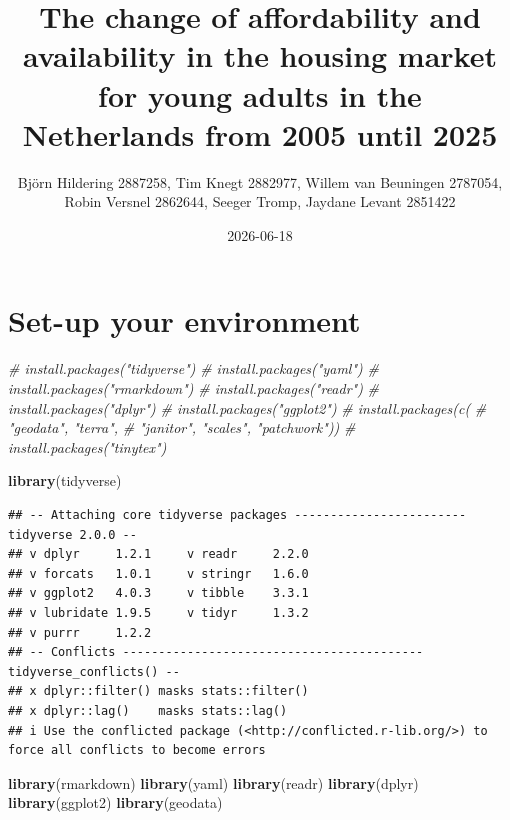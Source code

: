 \documentclass[
]{article}
\title{The change of affordability and availability in the housing
market for young adults in the Netherlands from 2005 until 2025}
\author{Björn Hildering 2887258, Tim Knegt 2882977, Willem van Beuningen
2787054, Robin Versnel 2862644, Seeger Tromp, Jaydane Levant 2851422}
\date{2026-06-18}
\newenvironment{Shaded}{\begin{snugshade}}{\end{snugshade}}
\newcommand{\CommentTok}[1]{\textcolor[rgb]{0.56,0.35,0.01}{\textit{#1}}}
\newcommand{\FunctionTok}[1]{\textcolor[rgb]{0.13,0.29,0.53}{\textbf{#1}}}
\newcommand{\NormalTok}[1]{#1}
\begin{document}
\maketitle

\section{Set-up your environment}\label{set-up-your-environment}

\begin{Shaded}
\begin{Highlighting}[]
\CommentTok{\# install.packages("tidyverse")}
\CommentTok{\# install.packages("yaml")}
\CommentTok{\# install.packages("rmarkdown")}
\CommentTok{\# install.packages("readr")}
\CommentTok{\# install.packages("dplyr")}
\CommentTok{\# install.packages("ggplot2")}
\CommentTok{\# install.packages(c(}
\CommentTok{\#   "geodata", "terra", }
\CommentTok{\#   "janitor", "scales", "patchwork"))}
\CommentTok{\# install.packages("tinytex")}
\end{Highlighting}
\end{Shaded}

\begin{Shaded}
\begin{Highlighting}[]
\FunctionTok{library}\NormalTok{(tidyverse)}
\end{Highlighting}
\end{Shaded}

\begin{verbatim}
## -- Attaching core tidyverse packages ------------------------ tidyverse 2.0.0 --
## v dplyr     1.2.1     v readr     2.2.0
## v forcats   1.0.1     v stringr   1.6.0
## v ggplot2   4.0.3     v tibble    3.3.1
## v lubridate 1.9.5     v tidyr     1.3.2
## v purrr     1.2.2     
## -- Conflicts ------------------------------------------ tidyverse_conflicts() --
## x dplyr::filter() masks stats::filter()
## x dplyr::lag()    masks stats::lag()
## i Use the conflicted package (<http://conflicted.r-lib.org/>) to force all conflicts to become errors
\end{verbatim}

\begin{Shaded}
\begin{Highlighting}[]
\FunctionTok{library}\NormalTok{(rmarkdown)}
\FunctionTok{library}\NormalTok{(yaml)}
\FunctionTok{library}\NormalTok{(readr)}
\FunctionTok{library}\NormalTok{(dplyr)}
\FunctionTok{library}\NormalTok{(ggplot2)}
\FunctionTok{library}\NormalTok{(geodata)}
\end{Highlighting}
\end{Shaded}
\end{document}
